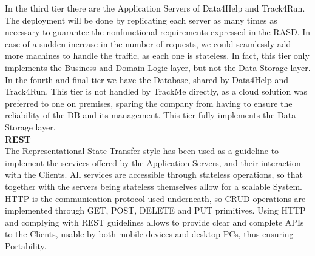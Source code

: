 \documentclass[titlepage]{article}
\begin{document}
In the third tier there are the Application Servers of Data4Help and Track4Run. The deployment will be done by replicating each server as many times as necessary to guarantee the nonfunctional requirements expressed in the RASD. In case of a sudden increase in the number of requests, we could seamlessly add more machines to handle the traffic, as each one is stateless. In fact, this tier only implements the Business and Domain Logic layer, but not the Data Storage layer. \\

In the fourth and final tier we have the Database, shared by Data4Help and Track4Run. This tier is not handled by TrackMe directly, as a cloud solution was preferred to one on premises, sparing the company from having to ensure the reliability of the DB and its management. 
This tier fully implements the Data Storage layer.\\

{\bf REST}\\
The Representational State Transfer style has been used as a guideline to implement the services offered by the Application Servers, and their interaction with the Clients. All services are accessible through stateless operations, so that together with the servers being stateless themselves allow for a scalable System.
HTTP is the communication protocol used underneath, so CRUD operations are implemented through GET, POST, DELETE and PUT primitives. 
Using HTTP and complying with REST guidelines allows to provide clear and complete APIs to the Clients, usable by both mobile devices and desktop PCs, thus ensuring Portability.\\
\end{document}
